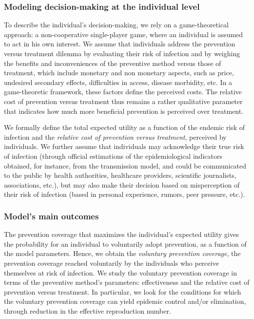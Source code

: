 \subsubsection{Modeling decision-making at the individual level}
To describe the individual's decision-making, we rely on a game-theoretical approach: a non-cooperative single-player game, where an individual is assumed to act in his own interest. 
We assume that individuals address the prevention versus treatment dilemma by evaluating their risk of infection and by weighing the benefits and inconveniences of the preventive method versus those of treatment, which include monetary and non monetary aspects, such as price, undesired secondary effects, difficulties in access, disease morbidity, etc. In a game-theoretic framework, these factors define the perceived costs. The relative cost of prevention versus treatment thus remains a rather qualitative parameter that indicates how much more beneficial prevention is perceived over treatment.

We formally define the total expected utility as a function of the endemic risk of infection and the {\it relative cost of prevention versus treatment}, perceived by individuals. We further assume that individuals may acknowledge their true risk of infection (through official estimations of the epidemiological indicators obtained, for instance, from the transmission model, and could be communicated to the public by health authorities, healthcare providers, scientific journalists, associations, etc.), but may also make their decision based on misperception of their risk of infection (based in personal experience, rumors, peer pressure, etc.). 

\subsubsection{Model's main outcomes}
The prevention coverage that maximizes the individual's expected utility gives the probability for an individual to voluntarily adopt prevention, as a function of the model parameters. Hence, we obtain the {\it voluntary prevention coverage}, the prevention coverage reached voluntarily by the individuals who perceive themselves at risk of infection. 
%
We study the voluntary prevention coverage in terms of the preventive method's parameters: effectiveness and the relative cost of prevention versus treatment. In particular, we look for the conditions for which the voluntary prevention coverage can yield epidemic control and/or elimination, through reduction in the effective reproduction number.

